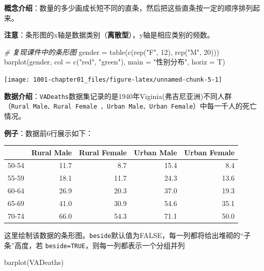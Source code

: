 \documentclass[
]{book}
\newenvironment{Shaded}{\begin{snugshade}}{\end{snugshade}}
\newcommand{\AttributeTok}[1]{\textcolor[rgb]{0.77,0.63,0.00}{#1}}
\newcommand{\CommentTok}[1]{\textcolor[rgb]{0.56,0.35,0.01}{\textit{#1}}}
\newcommand{\DecValTok}[1]{\textcolor[rgb]{0.00,0.00,0.81}{#1}}
\newcommand{\FunctionTok}[1]{\textcolor[rgb]{0.00,0.00,0.00}{#1}}
\newcommand{\NormalTok}[1]{#1}
\newcommand{\OtherTok}[1]{\textcolor[rgb]{0.56,0.35,0.01}{#1}}
\newcommand{\StringTok}[1]{\textcolor[rgb]{0.31,0.60,0.02}{#1}}
\begin{document}
\textbf{概念介绍}：数量的多少画成长短不同的直条，然后把这些直条按一定的顺序排列起来。

\textbf{注意}：条形图的x轴是数据类别（\textbf{离散型}），y轴是相应类别的频数。

\begin{Shaded}
\begin{Highlighting}[]
\CommentTok{\# 复现课件中的条形图}
\NormalTok{gender }\OtherTok{=} \FunctionTok{table}\NormalTok{(}\FunctionTok{c}\NormalTok{(}\FunctionTok{rep}\NormalTok{(}\StringTok{"F"}\NormalTok{, }\DecValTok{12}\NormalTok{), }\FunctionTok{rep}\NormalTok{(}\StringTok{"M"}\NormalTok{, }\DecValTok{20}\NormalTok{)))}
\FunctionTok{barplot}\NormalTok{(gender, }\AttributeTok{col =} \FunctionTok{c}\NormalTok{(}\StringTok{"red"}\NormalTok{, }\StringTok{"green"}\NormalTok{), }\AttributeTok{main =} \StringTok{"性别分布"}\NormalTok{, }\AttributeTok{horiz =}\NormalTok{ T)}
\end{Highlighting}
\end{Shaded}

\begin{center}\texttt{[image: 1001-chapter01\_files/figure-latex/unnamed-chunk-5-1]} \end{center}

\textbf{数据介绍}：\texttt{VADeaths}数据集记录的是1940年Viginia(弗吉尼亚洲)不同人群（\texttt{Rural\ Male、Rural\ Female\ 、Urban\ Male、Urban\ Female}）中每一千人的死亡情况。

\textbf{例子}：数据前6行展示如下：

\begin{tabular}{l|r|r|r|r}
\hline
  & Rural Male & Rural Female & Urban Male & Urban Female\\
\hline
50-54 & 11.7 & 8.7 & 15.4 & 8.4\\
\hline
55-59 & 18.1 & 11.7 & 24.3 & 13.6\\
\hline
60-64 & 26.9 & 20.3 & 37.0 & 19.3\\
\hline
65-69 & 41.0 & 30.9 & 54.6 & 35.1\\
\hline
70-74 & 66.0 & 54.3 & 71.1 & 50.0\\
\hline
\end{tabular}

这里绘制该数据的条形图。\texttt{beside}默认值为FALSE，每一列都将给出堆砌的``子条''高度，若 \texttt{beside=TRUE}，则每一列都表示一个分组并列

\begin{Shaded}
\begin{Highlighting}[]
\FunctionTok{barplot}\NormalTok{(VADeaths)}
\end{Highlighting}
\end{Shaded}
\end{document}
